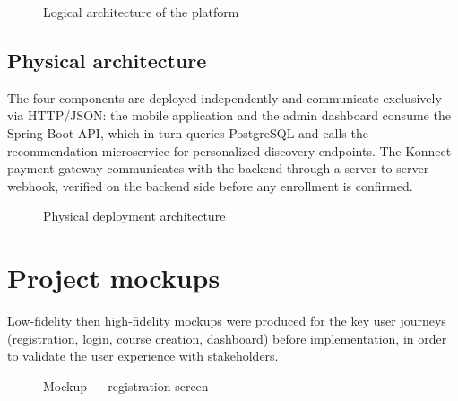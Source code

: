 \documentclass[a4paper,12pt]{report}
\begin{document}
\begin{figure}[H]
\centering
\caption{Logical architecture of the platform}
\label{fig:archi-logique}
\end{figure}

\subsection{Physical architecture}
The four components are deployed independently and communicate
exclusively via HTTP/JSON: the mobile application and the admin dashboard
consume the Spring Boot API, which in turn queries PostgreSQL and calls
the recommendation microservice for personalized discovery endpoints. The
Konnect payment gateway communicates with the backend through a
server-to-server webhook, verified on the backend side before any
enrollment is confirmed.

\begin{figure}[H]
\centering
\caption{Physical deployment architecture}
\label{fig:archi-physique}
\end{figure}

\section{Project mockups}
Low-fidelity then high-fidelity mockups were produced for the key user
journeys (registration, login, course creation, dashboard) before
implementation, in order to validate the user experience with
stakeholders.

\begin{figure}[H]
\centering
\caption{Mockup --- registration screen}
\end{figure}
\end{document}
